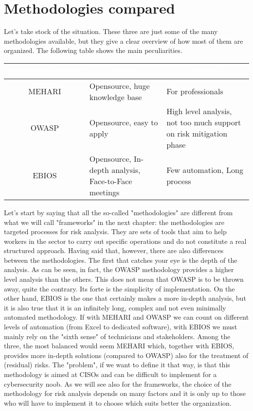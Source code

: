 \section{Methodologies compared}
Let's take stock of the situation. These three are just some of the many methodologies available, but they give a clear overview of how most of them are organized. The following table shows the main peculiarities.
\begin{table}[H]
\centering
\begin{tabularx}{\textwidth}{|c|X|X|} 
\hline
{\cellcolor{dummy-cyan}}\textbf{\textcolor{white}{METHODOLOGY}} &
\multicolumn{1}{|c|}{{\cellcolor{dummy-cyan}}\textbf{\textcolor{white}{PROS}}} & 
\multicolumn{1}{|c|}{{\cellcolor{dummy-cyan}}\textbf{\textcolor{white}{CONS}}}\\ 
\hline
{\cellcolor{dummy-yellow}}MEHARI & Opensource, huge knowledge base  & For professionals\\
\hline
{\cellcolor{dummy-yellow}}OWASP & Opensource, easy to apply  & High level analysis, not too much support on risk mitigation phase\\
\hline
{\cellcolor{dummy-yellow}}EBIOS & Opensource, In-depth analysis, Face-to-Face meetings & Few automation, Long process\\
\hline
\end{tabularx}
\end{table}\noindent
Let's start by saying that all the so-called "methodologies" are different from what we will call "frameworks" in the next chapter: the methodologies are targeted processes for risk analysis. They are sets of tools that aim to help workers in the sector to carry out specific operations and do not constitute a real structured approach. Having said that, however, there are also differences between the methodologies. The first that catches your eye is the depth of the analysis. As can be seen, in fact, the OWASP methodology provides a higher level analysis than the others. This does not mean that OWASP is to be thrown away, quite the contrary. Its forte is the simplicity of implementation. On the other hand, EBIOS is the one that certainly makes a more in-depth analysis, but it is also true that it is an infinitely long, complex and not even minimally automated methodology. If with MEHARI and OWASP we can count on different levels of automation (from Excel to dedicated software), with EBIOS we must mainly rely on the "sixth sense" of technicians and stakeholders. Among the three, the most balanced would seem MEHARI which, together with EBIOS, provides more in-depth solutions (compared to OWASP) also for the treatment of (residual) risks. The "problem", if we want to define it that way, is that this methodology is aimed at CISOs and can be difficult to implement for a cybersecurity noob. As we will see also for the frameworks, the choice of the methodology for risk analysis depends on many factors and it is only up to those who will have to implement it to choose which suits better the organization.


